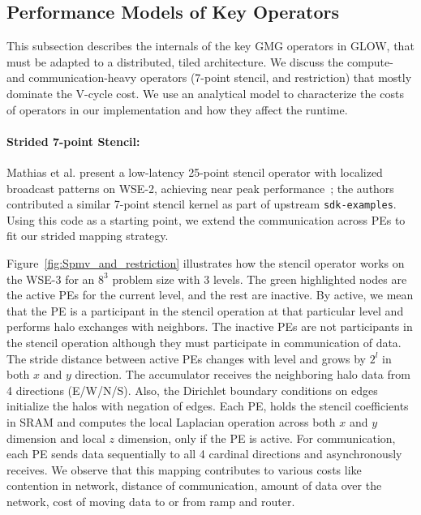 \documentclass[sigconf]{acmart}
\begin{document}
\subsection{Performance Models of Key Operators}
\label{sec:perfmodel}
    This subsection describes the internals of the key GMG operators in GLOW, that must be adapted to a distributed, tiled architecture. We discuss the compute- and communication-heavy operators (7-point stencil, and restriction) that mostly dominate the V-cycle cost. We use an analytical model to characterize the costs of operators in our implementation and how they affect the runtime.

    \paragraph{Strided 7-point Stencil:}    
   Mathias et al. present  %
   a low-latency 25-point stencil operator with localized broadcast patterns on WSE-2, achieving near peak performance~\cite{mathias}; the authors contributed a   similar 7-point stencil kernel as part of upstream \texttt{sdk-examples}.  Using this code as a starting point, we extend the communication across PEs to fit our strided mapping strategy. 
   
    Figure~\ref{fig:Spmv_and_restriction} illustrates how the stencil operator works on the WSE-3 for an $8^3$ problem size with 3 levels. %
    The green highlighted nodes are the active PEs for the current level, and the rest are inactive. By active, we mean that the PE is a participant in the stencil operation at that particular level and performs halo exchanges with neighbors. The inactive PEs are not participants in the stencil operation although they must participate in communication of data. The stride distance between active PEs changes with level and grows by $2^l$ in both $x$ and $y$ direction. 
    The accumulator receives the neighboring halo data from 4 directions (E/W/N/S).   Also, the Dirichlet boundary conditions on edges initialize the halos with negation of edges. Each PE, holds the stencil coefficients in SRAM and computes the local Laplacian operation across both $x$ and $y$ dimension and local $z$ dimension, only if the PE is active. For communication, each PE sends data sequentially to all 4 cardinal directions and asynchronously receives. We observe that this mapping contributes to various costs like contention in network, distance of communication, amount of data over the network, cost of moving data to or from ramp and router. 
    
\end{document}
